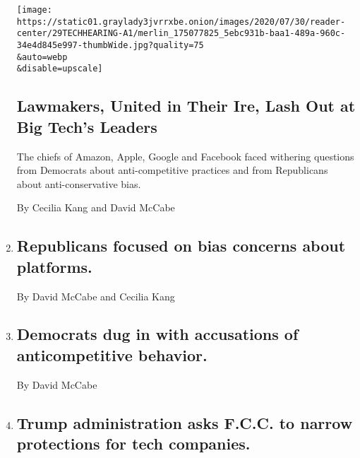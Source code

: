 \begin{enumerate}
  \texttt{[image: https://static01.graylady3jvrrxbe.onion/images/2020/07/30/reader-center/29TECHHEARING-A1/merlin\_175077825\_5ebc931b-baa1-489a-960c-34e4d845e997-thumbWide.jpg?quality=75\\\&auto=webp\\\&disable=upscale]}

  \hypertarget{lawmakers-united-in-their-ire-lash-out-at-big-techs-leaders}{%
  \subsection{Lawmakers, United in Their Ire, Lash Out at Big Tech's
  Leaders}\label{lawmakers-united-in-their-ire-lash-out-at-big-techs-leaders}}

  The chiefs of Amazon, Apple, Google and Facebook faced withering
  questions from Democrats about anti-competitive practices and from
  Republicans about anti-conservative bias.

  By Cecilia Kang and David McCabe
\item
  \href{/live/2020/07/29/technology/tech-ceos-hearing-testimony/republicans-focused-on-bias-concerns-about-platforms}{}

  \hypertarget{republicans-focused-on-bias-concerns-about-platforms}{%
  \subsection{Republicans focused on bias concerns about
  platforms.}\label{republicans-focused-on-bias-concerns-about-platforms}}

  By David McCabe and Cecilia Kang
\item
  \href{/live/2020/07/29/technology/tech-ceos-hearing-testimony/democrats-dug-in-with-accusations-of-anticompetitive-behavior}{}

  \hypertarget{democrats-dug-in-with-accusations-of-anticompetitive-behavior}{%
  \subsection{Democrats dug in with accusations of anticompetitive
  behavior.}\label{democrats-dug-in-with-accusations-of-anticompetitive-behavior}}

  By David McCabe
\item
  \href{/live/2020/07/29/technology/tech-ceos-hearing-testimony/trump-administration-asks-fcc-to-narrow-protections-for-tech-companies}{}

  \hypertarget{trump-administration-asks-fcc-to-narrow-protections-for-tech-companies}{%
  \subsection{Trump administration asks F.C.C. to narrow protections for
  tech
  companies.}\label{trump-administration-asks-fcc-to-narrow-protections-for-tech-companies}}


\end{enumerate}
